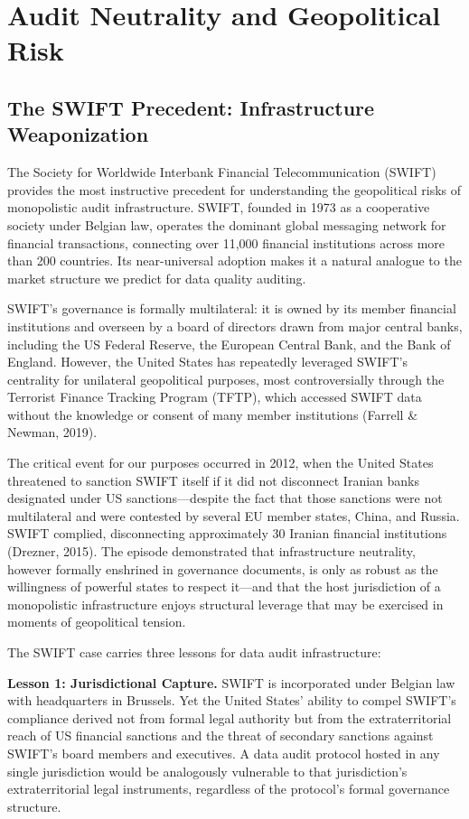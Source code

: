 \documentclass[12pt,a4paper]{article}
\theoremstyle{definition}
\theoremstyle{remark}
\begin{document}
\section{Audit Neutrality and Geopolitical Risk}

\subsection{The SWIFT Precedent: Infrastructure Weaponization}

The Society for Worldwide Interbank Financial Telecommunication (SWIFT) provides the most instructive precedent for understanding the geopolitical risks of monopolistic audit infrastructure. SWIFT, founded in 1973 as a cooperative society under Belgian law, operates the dominant global messaging network for financial transactions, connecting over 11,000 financial institutions across more than 200 countries. Its near-universal adoption makes it a natural analogue to the market structure we predict for data quality auditing.

SWIFT's governance is formally multilateral: it is owned by its member financial institutions and overseen by a board of directors drawn from major central banks, including the US Federal Reserve, the European Central Bank, and the Bank of England. However, the United States has repeatedly leveraged SWIFT's centrality for unilateral geopolitical purposes, most controversially through the Terrorist Finance Tracking Program (TFTP), which accessed SWIFT data without the knowledge or consent of many member institutions (Farrell \& Newman, 2019).

The critical event for our purposes occurred in 2012, when the United States threatened to sanction SWIFT itself if it did not disconnect Iranian banks designated under US sanctions—despite the fact that those sanctions were not multilateral and were contested by several EU member states, China, and Russia. SWIFT complied, disconnecting approximately 30 Iranian financial institutions (Drezner, 2015). The episode demonstrated that infrastructure neutrality, however formally enshrined in governance documents, is only as robust as the willingness of powerful states to respect it—and that the host jurisdiction of a monopolistic infrastructure enjoys structural leverage that may be exercised in moments of geopolitical tension.

The SWIFT case carries three lessons for data audit infrastructure:

\textbf{Lesson 1: Jurisdictional Capture.} SWIFT is incorporated under Belgian law with headquarters in Brussels. Yet the United States' ability to compel SWIFT's compliance derived not from formal legal authority but from the extraterritorial reach of US financial sanctions and the threat of secondary sanctions against SWIFT's board members and executives. A data audit protocol hosted in any single jurisdiction would be analogously vulnerable to that jurisdiction's extraterritorial legal instruments, regardless of the protocol's formal governance structure.
\end{document}
